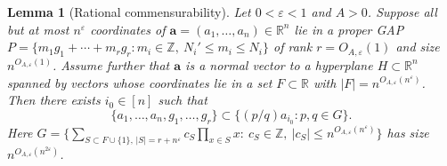 \documentclass[reqno]{amsart}
\newcommand\R{{\mathbb{R}}}
\newcommand\Z{{\mathbb{Z}}}
\newcommand\eps{{\varepsilon}}
\newcommand\BMa{{\bm a}}
\theoremstyle{plain}
\newtheorem{lemma}[theorem]{Lemma}
\theoremstyle{definition}
\begin{document}
\begin{lemma}[Rational commensurability]\label{lemma:commensurability}
Let $0<\eps<1$ and $A>0$. Suppose all but at most $n^{\eps}$ coordinates of $\BMa=(a_1,\dots,a_n)\in\R^n$ lie in a proper GAP
$P=\{m_1g_1+\cdots+m_rg_r: m_i\in\Z,\ N_i'\le m_i\le N_i\}$ of rank $r=O_{A,\eps}(1)$ and size $n^{O_{A,\eps}(1)}$. Assume further that $\BMa$ is a normal vector to a hyperplane $H\subset\R^n$ spanned by vectors whose coordinates lie in a set $F\subset\R$ with $|F|=n^{O_{A,\eps}(n^{\eps})}$. Then there exists $i_0\in[n]$ such that
\[
\{a_1,\dots,a_n,g_1,\dots,g_r\}\subset \{(p/q)a_{i_0}: p,q\in G\}.
\]
Here
$G=\{\sum_{S\subset F\cup\{1\},\,|S|=r+n^{\eps}} c_S\prod_{x\in S}x:
\ c_S\in\Z,\ |c_S|\le n^{O_{A,\eps}(n^{\eps})}\}$
has size $n^{O_{A,\eps}(n^{2\eps})}$.
\end{lemma}
\end{document}
